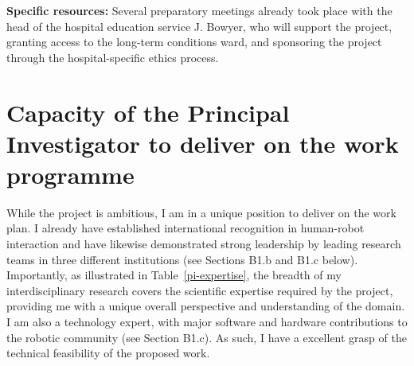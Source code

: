\textbf{Specific resources:} Several preparatory meetings already took place
with the head of the hospital education service J. Bowyer, who will support the
project, granting access to the long-term conditions ward, and sponsoring the
project through the hospital-specific ethics process.


\section{Capacity of the Principal Investigator to deliver on the work programme}

While the project is ambitious, I am in a unique position to deliver on the
\project work plan. I already have established international recognition in
human-robot interaction and have likewise demonstrated strong leadership by
leading research teams in three different institutions (see Sections B1.b and
B1.c below). Importantly, as illustrated in Table~\ref{pi-expertise}, the
breadth of my interdisciplinary research covers the scientific expertise
required by the project, providing me with a unique overall perspective and
understanding of the domain. I am also a technology expert, with major software
and hardware contributions to the robotic community (see Section B1.c). As such,
I have a excellent grasp of the technical feasibility of the proposed work.


